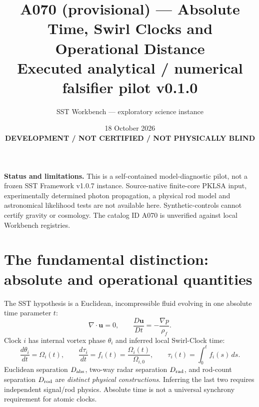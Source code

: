 \documentclass[10pt,a4paper]{article}
\title{\textbf{A070 (provisional) --- Absolute Time, Swirl Clocks and Operational Distance}\\[1mm]\large Executed analytical / numerical falsifier pilot v0.1.0}
\author{SST Workbench --- exploratory science instance}
\date{18 October 2026\\\textbf{DEVELOPMENT / NOT CERTIFIED / NOT PHYSICALLY BLIND}}
\newcommand{\rhof}{\rho_{\!f}}
\begin{document}
\maketitle
\noindent\textbf{Status and limitations.} This is a self-contained model-diagnostic pilot, not a frozen SST Framework v1.0.7 instance. Source-native finite-core PKLSA input, experimentally determined photon propagation, a physical rod model and astronomical likelihood tests are not available here. Synthetic-controls cannot certify gravity or cosmology. The catalog ID A070 is unverified against local Workbench registries.\par
\section{The fundamental distinction: absolute and operational quantities}
The SST hypothesis is a Euclidean, incompressible fluid evolving in one absolute time parameter $t$:
\begin{equation}\nabla\cdot\mathbf u=0,\qquad \frac{D\mathbf u}{Dt}=-\frac{\nabla p}{\rhof}.
\end{equation}
Clock $i$ has internal vortex phase $\theta_i$ and inferred local Swirl-Clock time:
\begin{equation}\label{eq:clock}\frac{d\theta_i}{dt}=\Omega_i(t),\qquad \frac{d\tau_i}{dt}=f_i(t)=\frac{\Omega_i(t)}{\Omega_{i,0}},\qquad \tau_i(t)=\int_0^t f_i(s)\,ds.
\end{equation}
Euclidean separation $D_{\rm abs}$, two-way radar separation $D_{\rm rad}$, and rod-count separation $D_{\rm rod}$ are \emph{distinct physical constructions}. Inferring the last two requires independent signal/rod physics. Absolute time is not a universal synchrony requirement for atomic clocks.
\end{document}
